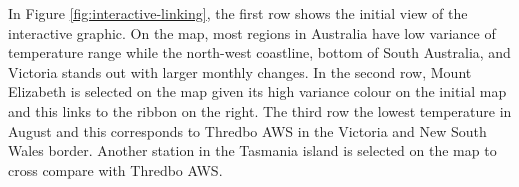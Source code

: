 \documentclass[
]{jss}
\newenvironment{Shaded}{\begin{snugshade}}{\end{snugshade}}
\newcommand{\AttributeTok}[1]{\textcolor[rgb]{0.77,0.63,0.00}{#1}}
\newcommand{\CommentTok}[1]{\textcolor[rgb]{0.56,0.35,0.01}{\textit{#1}}}
\newcommand{\FunctionTok}[1]{\textcolor[rgb]{0.00,0.00,0.00}{#1}}
\newcommand{\NormalTok}[1]{#1}
\newcommand{\OtherTok}[1]{\textcolor[rgb]{0.56,0.35,0.01}{#1}}
\newcommand{\SpecialCharTok}[1]{\textcolor[rgb]{0.00,0.00,0.00}{#1}}
\newcommand{\StringTok}[1]{\textcolor[rgb]{0.31,0.60,0.02}{#1}}
\begin{document}
\begin{Shaded}
\end{Shaded}

In Figure \ref{fig:interactive-linking}, the first row shows the initial
view of the interactive graphic. On the map, most regions in Australia
have low variance of temperature range while the north-west coastline,
bottom of South Australia, and Victoria stands out with larger monthly
changes. In the second row, Mount Elizabeth is selected on the map given
its high variance colour on the initial map and this links to the ribbon
on the right. The third row the lowest temperature in August and this
corresponds to Thredbo AWS in the Victoria and New South Wales border.
Another station in the Tasmania island is selected on the map to cross
compare with Thredbo AWS.
\end{document}
